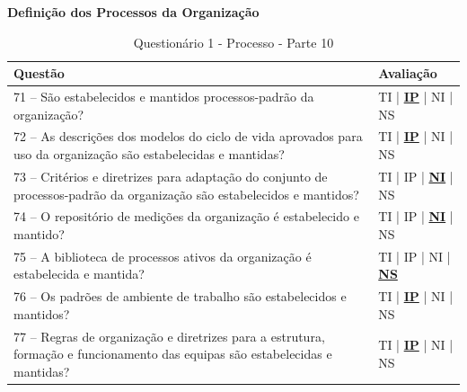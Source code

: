 \documentclass[openany,10pt,a4paper]{article}
\begin{document}
\begin{appendix}
	\begin{table}[H]
	\textbf{Definição dos Processos da Organização}
		\centering
		\caption{Questionário 1 - Processo - Parte 10}
		\begin{tabular}{|p{5in}p{1in}|}		
			\hline
			\textbf{Questão}  & \textbf{Avaliação}\\ 
			\hline
			71 – São estabelecidos e mantidos processos-padrão da organização?
	 & TI | \underline{\textbf{IP}} | NI | NS \\
			\hline
			72 – As descrições dos modelos do ciclo de vida aprovados para uso da organização são 
	estabelecidas e mantidas?
	 & TI | \underline{\textbf{IP}} | NI | NS \\
			\hline
			73 – Critérios e diretrizes para adaptação do conjunto de processos-padrão da organização são 
	estabelecidos e mantidos?
	 & TI | IP | \underline{\textbf{NI}} | NS \\
			\hline
			74 – O repositório de medições da organização é estabelecido e mantido?
	 & TI | IP | \underline{\textbf{NI}} | NS \\
			\hline
			75 – A biblioteca de processos ativos da organização é estabelecida e mantida?
	  & TI | IP | NI | \underline{\textbf{NS}} \\
			\hline
			76 – Os padrões de ambiente de trabalho são estabelecidos e mantidos?
	 & TI | \underline{\textbf{IP}} | NI | NS \\
			\hline
			77 – Regras de organização e diretrizes para a estrutura, formação e funcionamento das equipas 
	são estabelecidas e mantidas?
	& TI | \underline{\textbf{IP}} | NI | NS \\
			\hline
		\end{tabular} 
	\end{table}
	

\end{appendix}
\end{document}
